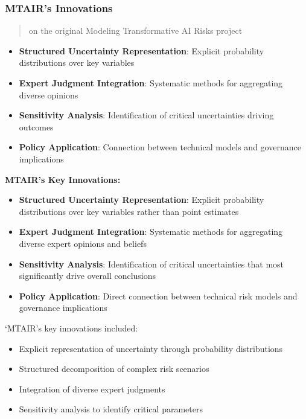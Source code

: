 \documentclass[
  11pt,
  letterpaper,
]{book}
\providecommand{\tightlist}{%
  \setlength{\itemsep}{0pt}\setlength{\parskip}{0pt}}
\begin{document}
\subsubsection{MTAIR's Innovations}\label{sec-mtair-innovations}

\begin{quote}
\textcite{bucknall2022} on the original Modeling Transformative AI Risks
project
\end{quote}

\begin{itemize}
\tightlist
\item
  \textbf{Structured Uncertainty Representation}: Explicit probability
  distributions over key variables
\item
  \textbf{Expert Judgment Integration}: Systematic methods for
  aggregating diverse opinions
\item
  \textbf{Sensitivity Analysis}: Identification of critical
  uncertainties driving outcomes
\item
  \textbf{Policy Application}: Connection between technical models and
  governance implications
\end{itemize}

\textbf{MTAIR's Key Innovations:}

\begin{itemize}
\tightlist
\item
  \textbf{Structured Uncertainty Representation}: Explicit probability
  distributions over key variables rather than point estimates
\item
  \textbf{Expert Judgment Integration}: Systematic methods for
  aggregating diverse expert opinions and beliefs
\item
  \textbf{Sensitivity Analysis}: Identification of critical
  uncertainties that most significantly drive overall conclusions
\item
  \textbf{Policy Application}: Direct connection between technical risk
  models and governance implications
\end{itemize}

`MTAIR's key innovations included:

\begin{itemize}
\tightlist
\item
  Explicit representation of uncertainty through probability
  distributions
\item
  Structured decomposition of complex risk scenarios
\item
  Integration of diverse expert judgments
\item
  Sensitivity analysis to identify critical parameters
\end{itemize}
\end{document}
